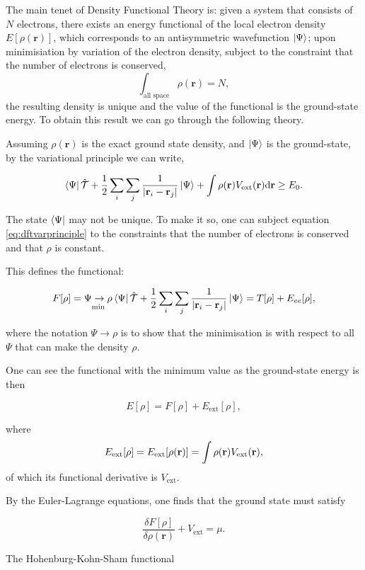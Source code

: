 \documentclass[11pt]{article}
\begin{document}
The main tenet of Density Functional Theory is: given a system that consists of \(N\) electrons,
there exists an energy functional of the local electron density \(E[\rho(\mathbf{r})]\), which
corresponds to an antisymmetric wavefunction \(\ket{\Psi}\); upon minimisiation by
variation of the electron density, subject to the constraint that the number of electrons is
conserved, \[ \int_{\text{all space}} \rho(\mathbf{r}) = N, \] the resulting density is unique
and the value of the functional is the ground-state energy. To obtain this result we can go
through the following theory.

Assuming \(\rho(\mathbf{r})\) is the exact ground state density, and \(\ket{\Psi}\)
is the ground-state, by the variational principle we can write, 

\[ \bra{\Psi} \mathcal{\hat{T}} + \frac{1}{2} \sum_i\sum_j \frac{1}{| \mathbf{r}_i -
\mathbf{r}_j |}  \ket{\Psi} + \int \rho(\mathbf{r}) V_{\text{ext}}(\mathbf{r})
\text{d}\mathbf{r} \geq E_0. 
\label{eq:dftvarprinciple} \]

The state \(\bra{\Psi}\) may not be unique. To make it so, one can subject equation \ref{eq:dftvarprinciple}
to the constraints that the number of electrons is conserved and that \(\rho\) is constant. 

This defines the functional: 

\[ F[\rho] = \underset{\text{min}}{\Psi \rightarrow \rho} \bra{\Psi} \mathcal{\hat{T}} +
\frac{1}{2} \sum_i\sum_j \frac{1}{| \mathbf{r}_i - \mathbf{r}_j |}  \ket{\Psi} = T[\rho] +
E_{ee}[\rho],   \]

where the notation \(\Psi \rightarrow \rho\) is to show that the minimisation is with respect to
all \(\Psi\) that can make the density \(\rho\). 

One can see the functional with the minimum value as the ground-state energy is then 

\[ E[\rho] = F[\rho] + E_{\text{ext}}[\rho], \]

where \[ E_{\text{ext}}[\rho] = E_{\text{ext}}[\rho(\mathbf{r})] =  \int \rho(\mathbf{r})
V_{\text{\text{ext}}}(\mathbf{r}), \]
of which its functional derivative is \(V_{\text{ext}}\).

By the Euler-Lagrange equations, one finds that the ground state must satisfy 

\[ \frac{\delta F[\rho]}{\delta \rho(\mathbf{r}) } + V_{\text{ext}}= \mu. \]



The Hohenburg-Kohn-Sham functional 
\end{document}

